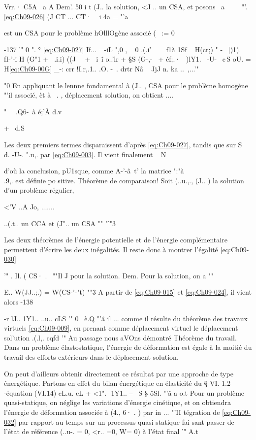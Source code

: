 {Vrr.· C5A 
~a 
A 
Dem'. 50 i t (J.. la solution, <J .. un CSA, et posons 
~a ~~ 
~ 
"'.
\eqref{eq:Ch09-026} (J CT ... CT·  
~i 
4a
= "'a 

est un CSA pour le problème hOlllOgène associé ( ~:= 0 

-137 
'" 0 ".
° 
\eqref{eq:Ch09-027} If... =-iL ",0 , ~ 0 
.(.i'~ ~~ f1\.à 1Sf ~ 
H(cr;) " -~ ])1). fI-'-i H (G"1 + ~.i.i) ((J~~ + ~i~î o..'lr 
+ §S (G-,-~ + éf;.·~ )lY1.~ -U-~ c\,S 
oU. 
= H\eqref{eq:Ch09-00G} _-: crr !I.r,.1.. .O. -~. drtr
Nâ ~ JjJ n. ka ..~,...'" 

"0
En appliquant le lennne fondamental à (J.. , CSA pour le problème homogène
"'il associé, èt à ~. , déplacement solution, on obtient 
.... 

" ~~.Q6-~à é;'À d.v 

+ ~d.S 

Les deux premiers termes disparaissent d'après \eqref{eq:Ch09-027}, tandis que sur S~ 
d.
-U-. ".u,. par \eqref{eq:Ch09-003}. Il vient finalement 
~ N 

d'où la conclusion, pU1sque, comme A-'-â~t' la matrice ":"à\\.9,. est définie po
sitive. 
Théorème de comparaison! Soit (..u.,., (J.. ) la solution d'un problème régulier, 

<'V ..A Jo, ....... ~ 

..(.t.. un CCA et (J".. un CSA 
"" "'"3 

Les deux théorèmes de l'énergie potentielle et de l'énergie com­plémentaire permettent d'écrire les deux inégalités. Il reste donc à montrer 
l'égalité 
\eqref{eq:Ch09-030} 

'" . Il. ( CS· . \ 
""Il J 
pour la solution. 
Dem. Pour la solution, on a 
"" 

E..
W(JJ..;.) = W(CS-'-"t) 
""3 
A partir de \eqref{eq:Ch09-015} et \eqref{eq:Ch09-024}, il vient alors 
-138 


-r lJ.. 1Y1.. ..u.. cLS 
'" 0
~è.Q "'â il ... 
comme il résulte du théorème des travaux virtuels \eqref{eq:Ch09-009}, en prenant comme dé­placement virtuel le déplacement sol'ution .(.l,. cqfd
'" 
Au passage nous aVOns démontré 
Théorème du travail. Dans un problème élastostatique, l'énergie de déforma­tion est égale à la moitié du travail des efforts extérieurs dans le dépla­cement solution. 

On peut d'ailleurs obtenir directement ce résultat par une appro­che de type énergétique. Partons en effet du bilan énergétique en élasticité du § VI. 1.2 -équation (VI.14) 
cL.u. cL
+ <1".  1Y1.. --~ S
§
ôSl. "'â a o.t 
Pour un problème quasi-statique, on néglige les variations d'énergie cinéti­que, et on obtiendra l'énergie de déformation associée à (4., 6· . ) par in
... "'II 
tégration de \eqref{eq:Ch09-032} par rapport au temps sur un processus quasi-statique fai
sant passer de l'état de référence (..u-. = 0, <r.. =0, W= 0) à l'état final 
'" A.t 


}
